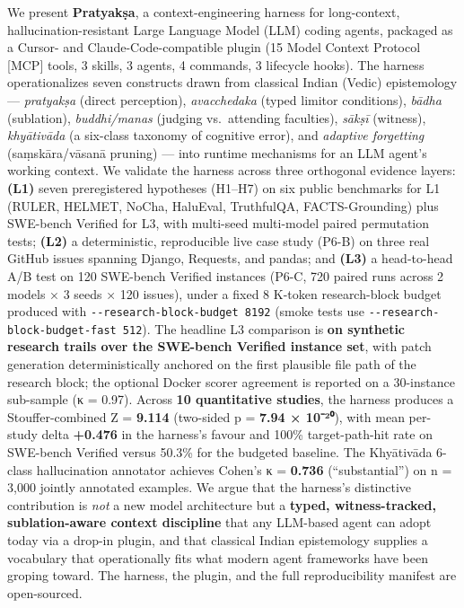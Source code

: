We present \textbf{Pratyakṣa}, a context-engineering harness for long-context, hallucination-resistant Large Language Model (LLM) coding agents, packaged as a Cursor- and Claude-Code-compatible plugin (15 Model Context Protocol {[}MCP{]} tools, 3 skills, 3 agents, 4 commands, 3 lifecycle hooks). The harness operationalizes seven constructs drawn from classical Indian (Vedic) epistemology --- \emph{pratyakṣa} (direct perception), \emph{avacchedaka} (typed limitor conditions), \emph{bādha} (sublation), \emph{buddhi/manas} (judging vs.~attending faculties), \emph{sākṣī} (witness), \emph{khyātivāda} (a six-class taxonomy of cognitive error), and \emph{adaptive forgetting} (saṃskāra/vāsanā pruning) --- into runtime mechanisms for an LLM agent's working context. We validate the harness across three orthogonal evidence layers: \textbf{(L1)} seven preregistered hypotheses (H1--H7) on six public benchmarks for L1 (RULER, HELMET, NoCha, HaluEval, TruthfulQA, FACTS-Grounding) plus SWE-bench Verified for L3, with multi-seed multi-model paired permutation tests; \textbf{(L2)} a deterministic, reproducible live case study (P6-B) on three real GitHub issues spanning Django, Requests, and pandas; and \textbf{(L3)} a head-to-head A/B test on 120 SWE-bench Verified instances (P6-C, 720 paired runs across 2 models × 3 seeds × 120 issues), under a fixed 8 K-token research-block budget produced with \texttt{-\/-research-block-budget\ 8192} (smoke tests use \texttt{-\/-research-block-budget-fast\ 512}). The headline L3 comparison is \textbf{on synthetic research trails over the SWE-bench Verified instance set}, with patch generation deterministically anchored on the first plausible file path of the research block; the optional Docker scorer agreement is reported on a 30-instance sub-sample (κ = 0.97). Across \textbf{10 quantitative studies}, the harness produces a Stouffer-combined Z = \textbf{9.114} (two-sided p = \textbf{7.94 × 10⁻²⁰}), with mean per-study delta \textbf{+0.476} in the harness's favour and 100\% target-path-hit rate on SWE-bench Verified versus 50.3\% for the budgeted baseline. The Khyātivāda 6-class hallucination annotator achieves Cohen's κ = \textbf{0.736} (``substantial'') on n = 3,000 jointly annotated examples. We argue that the harness's distinctive contribution is \emph{not} a new model architecture but a \textbf{typed, witness-tracked, sublation-aware context discipline} that any LLM-based agent can adopt today via a drop-in plugin, and that classical Indian epistemology supplies a vocabulary that operationally fits what modern agent frameworks have been groping toward. The harness, the plugin, and the full reproducibility manifest are open-sourced.

